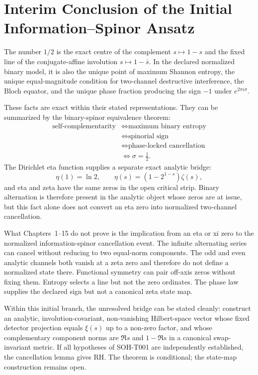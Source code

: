 \chapter{Interim Conclusion of the Initial Information--Spinor Ansatz}
\label{chap:conclusion}


The number $1/2$ is the exact centre of the complement $s\mapsto1-s$ and the fixed line of the conjugate-affine involution $s\mapsto1-\bar s$. In the declared normalized binary model, it is also the unique point of maximum Shannon entropy, the unique equal-magnitude condition for two-channel destructive interference, the Bloch equator, and the unique phase fraction producing the sign $-1$ under $e^{2\pi i\sigma}$.

These facts are exact within their stated representations. They can be summarized by the binary-spinor equivalence theorem:
\begin{align*}
 \text{self-complementarity}
 &\iff \text{maximum binary entropy}\\
 &\iff \text{spinorial sign}\\
 &\iff \text{phase-locked cancellation}\\
 &\iff \sigma=\frac12.
\end{align*}
The Dirichlet eta function supplies a separate exact analytic bridge:
\[
 \eta(1)=\ln2,
 \qquad
 \eta(s)=(1-2^{1-s})\zeta(s),
\]
and eta and zeta have the same zeros in the open critical strip. Binary alternation is therefore present in the analytic object whose zeros are at issue, but this fact alone does not convert an eta zero into normalized two-channel cancellation.

What Chapters~1--15 do not prove is the implication from an eta or xi zero to the normalized information-spinor cancellation event. The infinite alternating series can cancel without reducing to two equal-norm components. The odd and even analytic channels both vanish at a zeta zero and therefore do not define a normalized state there. Functional symmetry can pair off-axis zeros without fixing them. Entropy selects a line but not the zero ordinates. The phase law supplies the declared sign but not a canonical zeta state map.

Within this initial branch, the unresolved bridge can be stated cleanly: construct an analytic, involution-covariant, non-vanishing Hilbert-space vector whose fixed detector projection equals $\xi(s)$ up to a non-zero factor, and whose complementary component norms are $\Re s$ and $1-\Re s$ in a canonical swap-invariant metric. If all hypotheses of SOH-T001 are independently established, the cancellation lemma gives RH. The theorem is conditional; the state-map construction remains open.

